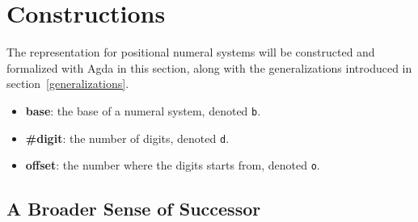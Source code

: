 \documentclass[\main/thesis.tex]{subfiles}
\begin{document}
\chapter{Constructions}\label{constructions}

The representation for positional numeral systems will be constructed and
formalized with Agda in this section,
along with the generalizations introduced in section~\ref{generalizations}.

\begin{itemize}
    \item \textbf{base}: the base of a numeral system, denoted {\lstinline|b|}.
    \item \textbf{\#digit}: the number of digits, denoted {\lstinline|d|}.
    \item \textbf{offset}: the number where the digits starts from, denoted {\lstinline|o|}.
\end{itemize}










\section{A Broader Sense of Successor}


%
%
%
\end{document}
